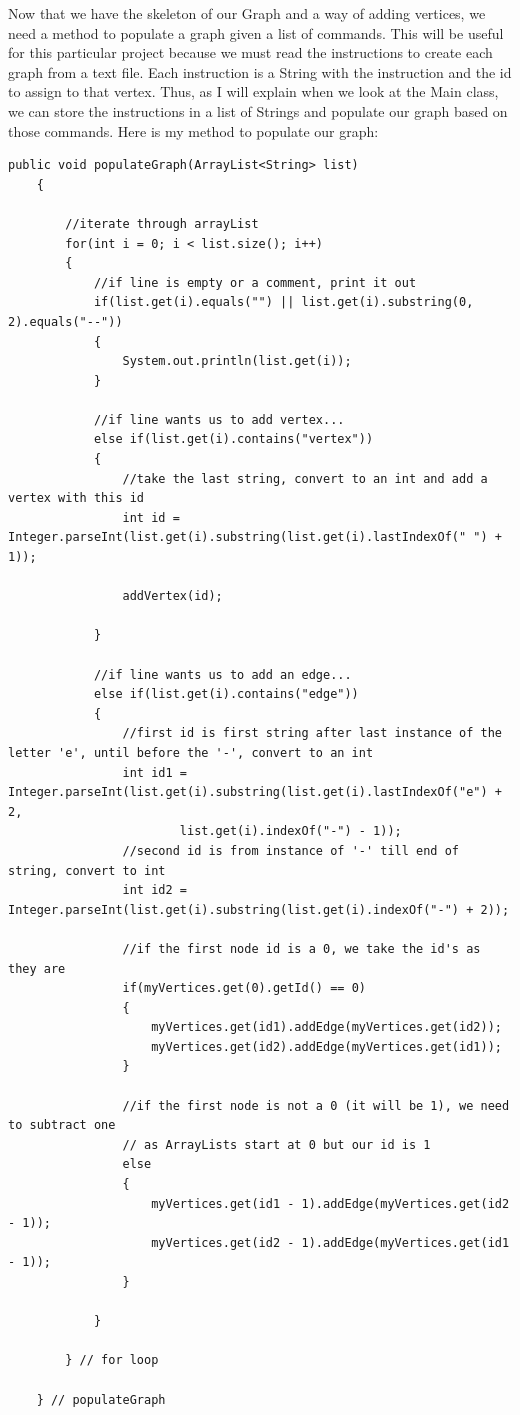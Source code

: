 \documentclass[letterpaper, 10pt]{article}
\begin{document}
Now that we have the skeleton of our Graph and a way of adding vertices, we need a method to populate a graph given a list of commands. This will be useful for this particular project because we must read the instructions to create each graph from a text file. Each instruction is a String with the instruction and the id to assign to that vertex. Thus, as I will explain when we look at the Main class, we can store the instructions in a list of Strings and populate our graph based on those commands. Here is my method to populate our graph:
\\
\begin{lstlisting}
public void populateGraph(ArrayList<String> list)
	{

        //iterate through arrayList
        for(int i = 0; i < list.size(); i++)
        {
            //if line is empty or a comment, print it out
            if(list.get(i).equals("") || list.get(i).substring(0, 2).equals("--"))
            {
                System.out.println(list.get(i));
            }

            //if line wants us to add vertex...
            else if(list.get(i).contains("vertex"))
            {
                //take the last string, convert to an int and add a vertex with this id
                int id = Integer.parseInt(list.get(i).substring(list.get(i).lastIndexOf(" ") + 1));
                
                addVertex(id);

            }

            //if line wants us to add an edge...
            else if(list.get(i).contains("edge"))
            {
                //first id is first string after last instance of the letter 'e', until before the '-', convert to an int
                int id1 = Integer.parseInt(list.get(i).substring(list.get(i).lastIndexOf("e") + 2,
                        list.get(i).indexOf("-") - 1));
                //second id is from instance of '-' till end of string, convert to int
                int id2 = Integer.parseInt(list.get(i).substring(list.get(i).indexOf("-") + 2));

                //if the first node id is a 0, we take the id's as they are
                if(myVertices.get(0).getId() == 0)
                {
                	myVertices.get(id1).addEdge(myVertices.get(id2));
                	myVertices.get(id2).addEdge(myVertices.get(id1));
                }

                //if the first node is not a 0 (it will be 1), we need to subtract one
                // as ArrayLists start at 0 but our id is 1
                else 
                {
                	myVertices.get(id1 - 1).addEdge(myVertices.get(id2 - 1));
                	myVertices.get(id2 - 1).addEdge(myVertices.get(id1 - 1));
                }

            }
            
        } // for loop
        
    } // populateGraph
\end{lstlisting}
\end{document}
